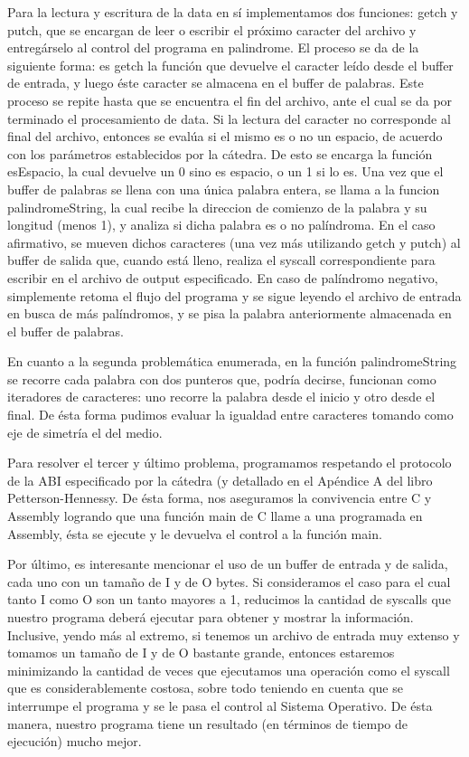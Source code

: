 \documentclass[a4paper,10pt]{article}
\begin{document}
	Para la lectura y escritura de la data en sí implementamos dos funciones: getch y putch, que se encargan de leer o escribir el próximo caracter del archivo y entregárselo al control del programa en
palindrome. El proceso se da de la siguiente forma: es getch la función que devuelve el caracter leído desde el buffer de entrada, y luego éste caracter se almacena en el buffer de palabras. Este proceso se repite hasta que se encuentra el fin del archivo, ante el cual se da por terminado el
procesamiento de data. Si la lectura del caracter no corresponde al final del archivo, entonces se evalúa si el mismo es o no un espacio, de acuerdo con los parámetros establecidos por la cátedra. De esto se encarga la función esEspacio, la cual devuelve un 0 sino es espacio, o un 1 si lo es. Una vez que el buffer de palabras se llena con una única palabra entera, se llama a la funcion palindromeString, la cual recibe la direccion de comienzo de la palabra y su longitud (menos 1), y analiza si dicha palabra es o no palíndroma. En el caso afirmativo, se mueven dichos caracteres (una vez más utilizando getch y putch) al buffer de salida que, cuando está lleno, realiza el syscall correspondiente para escribir en el archivo de output especificado. En caso de palíndromo negativo, simplemente retoma el flujo del programa y se sigue leyendo el archivo de entrada en busca de más palíndromos, y se pisa la palabra anteriormente almacenada en el buffer de palabras.

\indent	
	En cuanto a la segunda problemática enumerada, en la función palindromeString se recorre cada palabra con dos punteros que, podría decirse, funcionan como iteradores de caracteres: uno recorre la palabra desde el inicio y otro desde el final. De ésta forma pudimos evaluar la igualdad entre caracteres tomando como eje de simetría el del medio.

\indent	
	Para resolver el tercer y último problema, programamos respetando el protocolo de la ABI especificado por la cátedra (y detallado en el Apéndice A del libro Petterson-Hennessy. De ésta forma, nos aseguramos la convivencia entre C y Assembly logrando que una función main de C llame a una programada en Assembly, ésta se ejecute y le devuelva el control a la función main.

\indent	
	Por último, es interesante mencionar el uso de un buffer de entrada y de salida, cada uno con un tamaño de I y de O bytes. Si consideramos el caso para el cual tanto I como O son un tanto mayores a 1, reducimos la cantidad de syscalls que nuestro programa deberá ejecutar para obtener y mostrar la información. Inclusive, yendo más al extremo, si tenemos un archivo de entrada muy extenso y tomamos un tamaño de I y de O bastante grande, entonces estaremos minimizando la cantidad de veces que ejecutamos una operación como el syscall que es considerablemente costosa, sobre todo teniendo en cuenta que se interrumpe el programa y se le pasa el control al Sistema Operativo. De ésta manera, nuestro programa tiene un resultado (en términos de tiempo de ejecución) mucho mejor.
	
\end{document}
